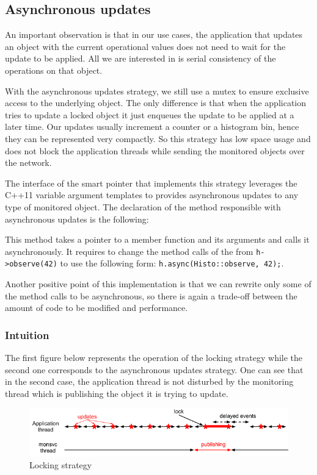 \subsection*{Asynchronous updates}

An important observation is that in our use cases, the application that updates an object with the current operational values does not need to wait for the update to be applied. All we are interested in is serial consistency of the operations on that object. 

With the asynchronous updates strategy, we still use a mutex to ensure exclusive access to the underlying object. The only difference is that when the application tries to update a locked object it just enqueues the update to be applied at a later time. Our updates usually increment a counter or a histogram bin, hence they can be represented very compactly. So this strategy has low space usage and does not block the application threads while sending the monitored objects over the network.

The interface of the smart pointer that implements this strategy leverages the C++11 variable argument templates to provides asynchronous updates to any type of monitored object. The declaration of the method responsible with asynchronous updates is the following:


This method takes a pointer to a member function and its arguments and calls it asynchronously. It requires to change the method calls of the from \verb+h->observe(42)+ to use the following form: \verb+h.async(Histo::observe, 42);+.

Another positive point of this implementation is that we can rewrite only some of the method calls to be asynchronous, so there is again a trade-off between the amount of code to be modified and performance.

\subsubsection*{Intuition}

The first figure below represents the operation of the locking strategy while the second one corresponds to the asynchronous updates strategy. One can see that in the second case, the application thread is not disturbed by the monitoring thread which is publishing the object it is trying to update.
\begin{figure}[ht!]
\centering
\includegraphics[scale=0.6]{Images/async_before.png}
\caption{Locking strategy}
\end{figure}

